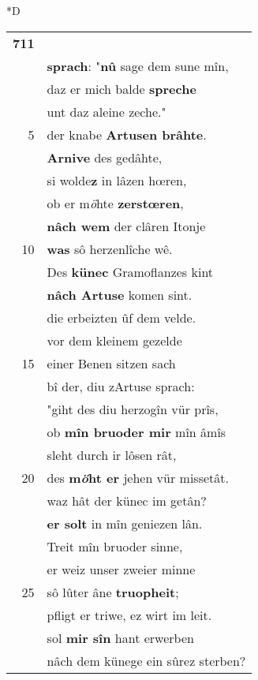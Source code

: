 \documentclass[8pt,a4paper,notitlepage]{article}
\begin{document}
\begin{table}[ht]
\begin{minipage}[t]{0.5\linewidth}
\small
\begin{center}*D
\end{center}
\begin{tabular}{rl}
\textbf{711} & \textbf{\begin{large}A\end{large}rnive} z\textbf{eime} junchêrrelîn\\ 
 & \textbf{sprach}: "\textbf{nû} sage dem sune mîn,\\ 
 & daz er mich balde \textbf{spreche}\\ 
 & unt daz aleine zeche."\\ 
5 & der knabe \textbf{Artusen brâhte}.\\ 
 & \textbf{Arnive} des gedâhte,\\ 
 & si wolde\textbf{z} in lâzen hœren,\\ 
 & ob er m\textit{ö}hte \textbf{zerstœren},\\ 
 & \textbf{nâch wem} der clâren Itonje\\ 
10 & \textbf{was} sô herzenlîche wê.\\ 
 & Des \textbf{künec} Gramoflanzes kint\\ 
 & \textbf{nâch Artuse} komen sint.\\ 
 & die erbeizten ûf dem velde.\\ 
 & vor dem kleinem gezelde\\ 
15 & einer Benen sitzen sach\\ 
 & bî der, diu zArtuse sprach:\\ 
 & "giht des diu herzogîn vür prîs,\\ 
 & ob \textbf{mîn bruoder mir} mîn âmîs\\ 
 & sleht durch ir lôsen rât,\\ 
20 & des \textbf{m\textit{ö}ht er} jehen vür missetât.\\ 
 & waz hât der künec im getân?\\ 
 & \textbf{er solt} in mîn geniezen lân.\\ 
 & Treit mîn bruoder sinne,\\ 
 & er weiz unser zweier minne\\ 
25 & sô lûter âne \textbf{truopheit};\\ 
 & pfligt er triwe, ez wirt im leit.\\ 
 & sol \textbf{mir sîn} hant erwerben\\ 
 & nâch dem künege ein sûrez sterben?\\ 

\end{tabular}
\end{minipage}
\end{table}
\end{document}
